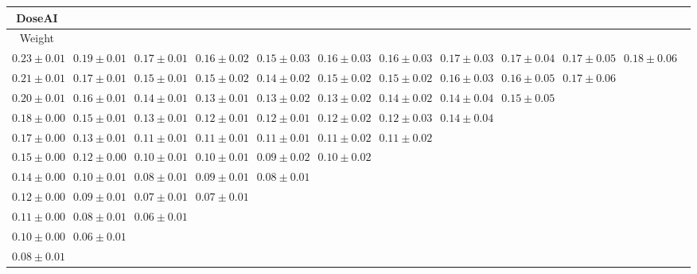 \begin{table}[ht]
{{\begin{adjustbox}{width=\textwidth}
\begin{tabular}{cccccccccccc}
\hline
DoseAI &  &  &  &  &  &  &  &  &  & \\
\hline
Weight &  &  &  &  &  &  &  &  &  & \\
\hline
$0.23 \pm 0.01$ & $0.19 \pm 0.01$ & $0.17 \pm 0.01$ & $0.16 \pm 0.02$ & $0.15 \pm 0.03$ & $0.16 \pm 0.03$ & $0.16 \pm 0.03$ & $0.17 \pm 0.03$ & $0.17 \pm 0.04$ & $0.17 \pm 0.05$ & $0.18 \pm 0.06$ &  \\
$0.21 \pm 0.01$ & $0.17 \pm 0.01$ & $0.15 \pm 0.01$ & $0.15 \pm 0.02$ & $0.14 \pm 0.02$ & $0.15 \pm 0.02$ & $0.15 \pm 0.02$ & $0.16 \pm 0.03$ & $0.16 \pm 0.05$ & $0.17 \pm 0.06$ &  &  \\
$0.20 \pm 0.01$ & $0.16 \pm 0.01$ & $0.14 \pm 0.01$ & $0.13 \pm 0.01$ & $0.13 \pm 0.02$ & $0.13 \pm 0.02$ & $0.14 \pm 0.02$ & $0.14 \pm 0.04$ & $0.15 \pm 0.05$ &  &  &  \\
$0.18 \pm 0.00$ & $0.15 \pm 0.01$ & $0.13 \pm 0.01$ & $0.12 \pm 0.01$ & $0.12 \pm 0.01$ & $0.12 \pm 0.02$ & $0.12 \pm 0.03$ & $0.14 \pm 0.04$ &  &  &  &  \\
$0.17 \pm 0.00$ & $0.13 \pm 0.01$ & $0.11 \pm 0.01$ & $0.11 \pm 0.01$ & $0.11 \pm 0.01$ & $0.11 \pm 0.02$ & $0.11 \pm 0.02$ &  &  &  &  &  \\
$0.15 \pm 0.00$ & $0.12 \pm 0.00$ & $0.10 \pm 0.01$ & $0.10 \pm 0.01$ & $0.09 \pm 0.02$ & $0.10 \pm 0.02$ &  &  &  &  &  &  \\
$0.14 \pm 0.00$ & $0.10 \pm 0.01$ & $0.08 \pm 0.01$ & $0.09 \pm 0.01$ & $0.08 \pm 0.01$ &  &  &  &  &  &  &  \\
$0.12 \pm 0.00$ & $0.09 \pm 0.01$ & $0.07 \pm 0.01$ & $0.07 \pm 0.01$ &  &  &  &  &  &  &  &  \\
$0.11 \pm 0.00$ & $0.08 \pm 0.01$ & $0.06 \pm 0.01$ &  &  &  &  &  &  &  &  &  \\
$0.10 \pm 0.00$ & $0.06 \pm 0.01$ &  &  &  &  &  &  &  &  &  &  \\
$0.08 \pm 0.01$ &  &  &  &  &  &  &  &  &  &  &  \\



\end{tabular}
\end{adjustbox}}}
\end{table}
